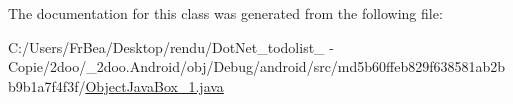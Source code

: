 The documentation for this class was generated from the following file:\begin{CompactItemize}
\item 
C:/Users/FrBea/Desktop/rendu/DotNet\_\-todolist\_ - Copie/2doo/\_\-2doo.Android/obj/Debug/android/src/md5b60ffeb829f638581ab2bb9b1a7f4f3f/\hyperlink{_object_java_box__1_8java}{ObjectJavaBox\_\-1.java}\end{CompactItemize}
